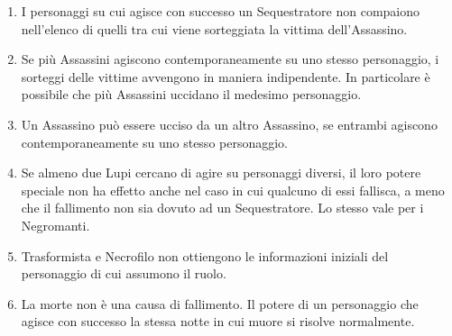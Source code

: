 \documentclass[a4paper,10pt]{article}
\begin{document}
\begin{enumerate}
 \item I personaggi su cui agisce con successo un Sequestratore non compaiono nell'elenco di quelli tra cui viene sorteggiata la vittima dell'Assassino.
 
 \item Se più Assassini agiscono contemporaneamente su uno stesso personaggio, i sorteggi delle vittime avvengono in maniera indipendente.
 In particolare è possibile che più Assassini uccidano il medesimo personaggio.
 
 \item Un Assassino può essere ucciso da un altro Assassino, se entrambi agiscono contemporaneamente su uno stesso personaggio.
 
 \item Se almeno due Lupi cercano di agire su personaggi diversi, il loro potere speciale non ha effetto anche nel caso in cui qualcuno di essi fallisca, a meno che il fallimento non sia dovuto ad un Sequestratore. Lo stesso vale per i Negromanti.
 
 
 
 \item Trasformista e Necrofilo non ottiengono le informazioni iniziali del personaggio di cui assumono il ruolo.
 
 \item La morte non è una causa di fallimento. Il potere di un personaggio che agisce con successo la stessa notte in cui muore si risolve normalmente.
 
\end{enumerate}



\printindex
\end{document}
